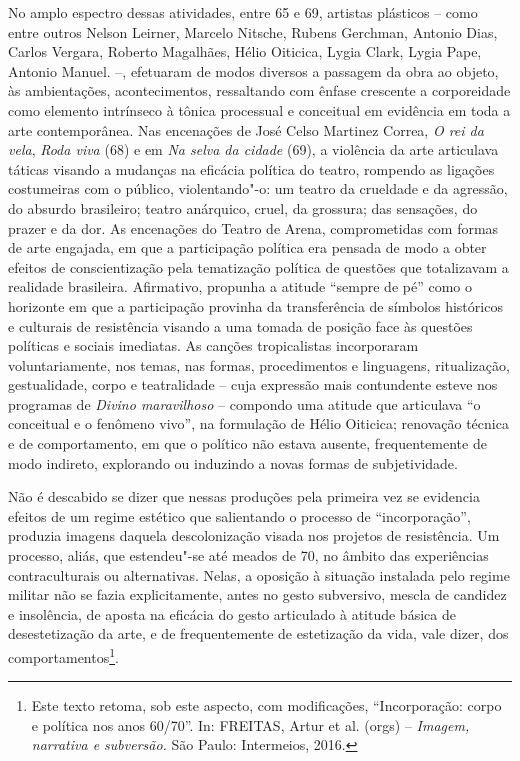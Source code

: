 No amplo espectro dessas atividades, entre 65 e 69, artistas plásticos
-- como entre outros Nelson Leirner, Marcelo Nitsche, Rubens Gerchman,
Antonio Dias, Carlos Vergara, Roberto Magalhães, Hélio Oiticica, Lygia
Clark, Lygia Pape, Antonio Manuel. --, efetuaram de modos diversos a
passagem da obra ao objeto, às ambientações, acontecimentos, ressaltando
com ênfase crescente a corporeidade como elemento intrínseco à tônica
processual e conceitual em evidência em toda a arte contemporânea. Nas
encenações de José Celso Martinez Correa, \emph{O rei da vela},
\emph{Roda viva} (68) e em \emph{Na selva da cidade} (69), a violência da
arte articulava táticas visando a mudanças na eficácia política do
teatro, rompendo as ligações costumeiras com o público, violentando"-o:
um teatro da crueldade e da agressão, do absurdo brasileiro; teatro
anárquico, cruel, da grossura; das sensações, do prazer e da dor. As
encenações do Teatro de Arena, comprometidas com formas de arte
engajada, em que a participação política era pensada de modo a obter
efeitos de conscientização pela tematização política de questões que
totalizavam a realidade brasileira. Afirmativo, propunha a atitude
``sempre de pé'' como o horizonte em que a participação provinha da
transferência de símbolos históricos e culturais de resistência visando
a uma tomada de posição face às questões políticas e sociais imediatas.
As canções tropicalistas incorporaram voluntariamente, nos temas, nas
formas, procedimentos e linguagens, ritualização, gestualidade, corpo e
teatralidade -- cuja expressão mais contundente esteve nos programas de
 \emph{Divino maravilhoso} -- compondo uma atitude que articulava ``o
conceitual e o fenômeno vivo'', na formulação de Hélio Oiticica;
renovação técnica e de comportamento, em que o político não estava
ausente, frequentemente de modo indireto, explorando ou induzindo a
novas formas de subjetividade.

Não é descabido se dizer que nessas produções pela primeira vez se
evidencia efeitos de um regime estético que salientando o processo de
``incorporação'', produzia imagens daquela descolonização visada nos
projetos de resistência. Um processo, aliás, que estendeu"-se até meados
de 70, no âmbito das experiências contraculturais ou alternativas.
Nelas, a oposição à situação instalada pelo regime militar não se fazia
explicitamente, antes no gesto subversivo, mescla de candidez e
insolência, de aposta na eficácia do gesto articulado à atitude básica
de desestetização da arte, e de frequentemente de estetização da vida,
vale dizer, dos comportamentos\footnote{Este texto retoma, sob este
  aspecto, com modificações, ``Incorporação: corpo e política nos anos
  60/70''. In: \textsc{FREITAS}, Artur et al. (orgs) -- \emph{Imagem, narrativa e
  subversão.} São Paulo: Intermeios, 2016.}.

